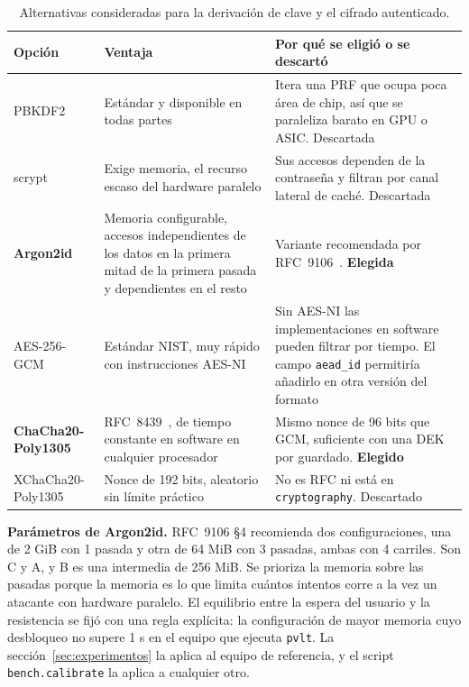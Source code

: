 \documentclass[11pt,letterpaper]{article}
\newcommand{\code}[1]{\texttt{#1}}
\newcommand{\pvlt}{\code{pvlt}}
\begin{document}
\begin{table}[h]
\centering\small
\caption{Alternativas consideradas para la derivación de clave y el cifrado autenticado.}
\label{tab:alternativas}
\begin{tabularx}{\linewidth}{@{}l>{\raggedright\arraybackslash}X>{\raggedright\arraybackslash}X@{}}
\toprule
Opción & Ventaja & Por qué se eligió o se descartó \\
\midrule
PBKDF2 & Estándar y disponible en todas partes & Itera una PRF que ocupa poca área de chip, así que se paraleliza barato en GPU o ASIC. Descartada \\
scrypt & Exige memoria, el recurso escaso del hardware paralelo & Sus accesos dependen de la contraseña y filtran por canal lateral de caché. Descartada \\
\textbf{Argon2id} & Memoria configurable, accesos independientes de los datos en la primera mitad de la primera pasada y dependientes en el resto & Variante recomendada por RFC~9106~\cite{rfc9106}. \textbf{Elegida} \\
\midrule
AES-256-GCM & Estándar NIST, muy rápido con instrucciones AES-NI & Sin AES-NI las implementaciones en software pueden filtrar por tiempo. El campo \code{aead\_id} permitiría añadirlo en otra versión del formato \\
\textbf{ChaCha20-Poly1305} & RFC~8439~\cite{rfc8439}, de tiempo constante en software en cualquier procesador & Mismo nonce de 96 bits que GCM, suficiente con una DEK por guardado. \textbf{Elegido} \\
XChaCha20-Poly1305 & Nonce de 192 bits, aleatorio sin límite práctico & No es RFC ni está en \code{cryptography}. Descartado \\
\bottomrule
\end{tabularx}
\end{table}

\textbf{Parámetros de Argon2id.} RFC~9106 §4 recomienda dos configuraciones, una de 2 GiB con 1 pasada y otra de 64 MiB con 3 pasadas, ambas con 4 carriles. Son C y A, y B es una intermedia de 256 MiB. Se prioriza la memoria sobre las pasadas porque la memoria es lo que limita cuántos intentos corre a la vez un atacante con hardware paralelo. El equilibrio entre la espera del usuario y la resistencia se fijó con una regla explícita: la configuración de mayor memoria cuyo desbloqueo no supere 1 s en el equipo que ejecuta \pvlt. La sección~\ref{sec:experimentos} la aplica al equipo de referencia, y el script \code{bench.calibrate} la aplica a cualquier otro.
\end{document}
